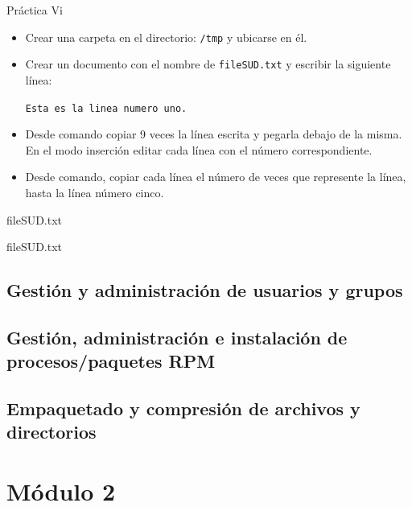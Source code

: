 \documentclass{beamer}
\begin{document}
\begin{frame}{Práctica Vi}
\begin{itemize}
    \item Crear una carpeta en el directorio: \texttt{/tmp} y ubicarse en él.
    \item Crear un documento con el nombre de \texttt{fileSUD.txt} y escribir la siguiente línea:
    \begin{center}
        \texttt{Esta es la linea numero uno.}
    \end{center}
    \item Desde comando copiar 9 veces la línea escrita y pegarla debajo de la misma. En el modo inserción editar cada línea con el número correspondiente.
    \item Desde comando, copiar cada línea el número de veces que represente la línea, hasta la línea número cinco.
\end{itemize}
\end{frame}
\begin{frame}{fileSUD.txt}

\end{frame}

\begin{frame}{fileSUD.txt}



\end{frame}

\subsection{Gestión y administración de usuarios y grupos}
\subsection{Gestión, administración e instalación de procesos/paquetes RPM}
\subsection{Empaquetado y compresión de archivos y directorios}
\section{Módulo 2}


\end{document}
